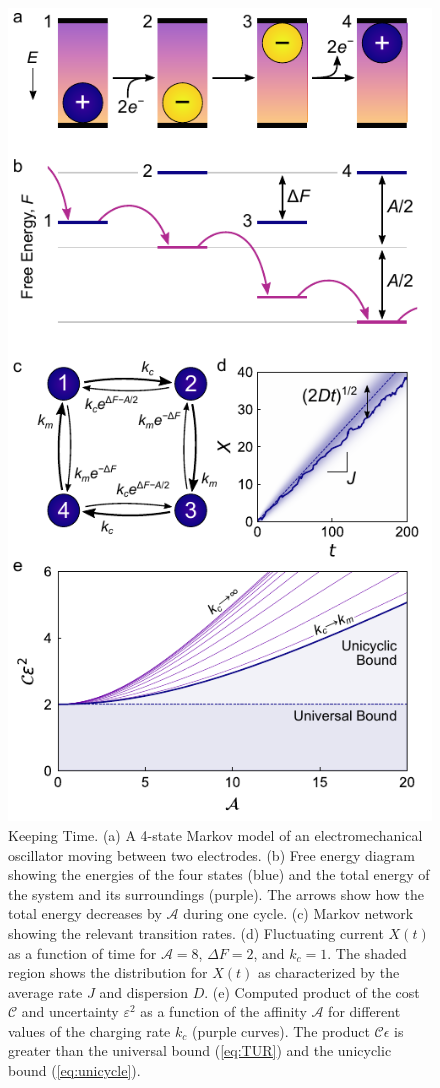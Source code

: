 \begin{appendices}
\begin{figure}[p!]
    \centering
    \includegraphics{figures/A5_KeepingTime.pdf}
    \caption{Keeping Time. (a) A 4-state Markov model of an electromechanical oscillator moving between two electrodes. (b) Free energy diagram showing the energies of the four states (blue) and the total energy of the system and its surroundings (purple). The arrows show how the total energy decreases by $\mathcal{A}$ during one cycle. (c) Markov network showing the relevant transition rates. (d) Fluctuating current $X(t)$ as a function of time for $\mathcal{A}=8$, $\Delta F=2$, and $k_c= 1$.  The shaded region shows the distribution for $X(t)$ as characterized by the average rate $J$ and dispersion $D$. (e) Computed product of the cost $\mathcal{C}$ and uncertainty $\varepsilon^2$ as a function of the affinity $\mathcal{A}$ for different values of the charging rate $k_c$ (purple curves).  The product $\mathcal{C}\epsilon$ is greater than the universal bound (\ref{eq:TUR}) and the unicyclic bound (\ref{eq:unicycle}). }

\end{figure}
\end{appendices}
